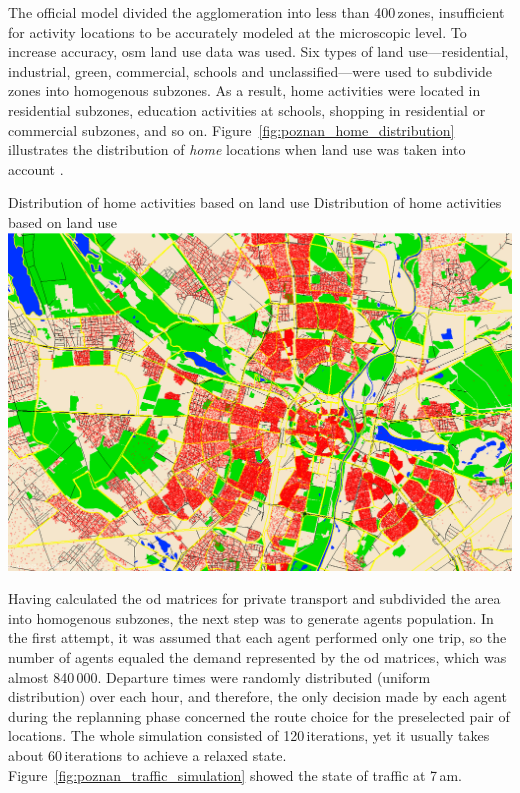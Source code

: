 The official model divided the agglomeration into less than 400\,zones, insufficient for activity locations to be accurately modeled at the microscopic level. To increase accuracy, \gls{osm} land use data was used. Six types of land use---residential, industrial, green, commercial, schools and unclassified---were used to subdivide zones into homogenous subzones. As a result, home activities were located in residential subzones, education activities at schools, shopping in residential or commercial subzones, and so on. Figure~\ref{fig:poznan_home_distribution} illustrates the distribution of \emph{home} locations when land use was taken into account \cite{PiatkowskiMaciejewski2013LandUse}.

\createfigure%
{Distribution of home activities based on land use}%
{Distribution of home activities based on land use}%
{\label{fig:poznan_home_distribution}}%
{\includegraphics[width=\textwidth, angle=0]{using/figures/poznan_home_distribution}}%
{}%

Having calculated the \gls{od} matrices for private transport and subdivided the area into homogenous subzones, the next step was to generate agents population. In the first attempt, it was assumed that each agent performed only one trip, so the number of agents equaled the demand represented by the \gls{od} matrices, which was almost 840\,000. Departure times were randomly distributed (uniform distribution) over each hour, and therefore, the only decision made by each agent during the replanning phase concerned the route choice for the preselected pair of locations. The whole simulation consisted of 120\,iterations, yet it usually takes about 60\,iterations to achieve a relaxed state. Figure~\ref{fig:poznan_traffic_simulation} showed the state of traffic at 7\,am.

